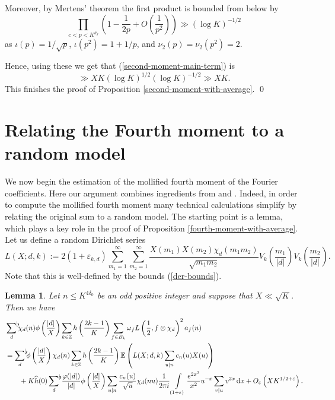 \documentclass[a4paper,10pt,twoside]{amsart}
\newtheorem{lemma}[theorem]{Lemma}
\theoremstyle{definition}
\numberwithin{equation}{section}
\newcommand\Z{\mathbb{Z}}
\newcommand\eps{\varepsilon}
\renewcommand\:{\colon}
\newcommand{\sumflat}{\mathop{{\sum}^{\raisebox{-3pt}{\makebox[0pt][l]{$\flat$}}}}}
\begin{document}
Moreover, by Mertens' theorem the first product is bounded from below by
\[ 
\prod_{c<p<K^{\theta_J}}\left(1-\frac1{2p}+O\left(\frac1{p^2}\right)\right)\gg (\log K)^{-1/2}
\]
as $\iota(p)=1/\sqrt p$, $\iota(p^2)=1+1/p$, and $\nu_2(p)=\nu_2(p^2)=2$.

Hence, using these we get that (\ref{second-moment-main-term}) is
\[ 
\gg XK(\log K)^{1/2}(\log K)^{-1/2}\gg XK.\]
This finishes the proof of Proposition \ref{second-moment-with-average}. \qed

\section{Relating the Fourth moment to a random model}

\noindent We now begin the estimation of the mollified fourth moment of the Fourier coefficients. Here our argument combines ingredients from \cite{Bui-Evans-Lester-Pratt2022} and \cite{Khan2010}. Indeed, in order to compute the mollified fourth moment many technical calculations simplify by relating the original sum to a random model. The starting point is a lemma, which plays a key role in the proof of Proposition \ref{fourth-moment-with-average}. Let us define a random Dirichlet series
\[ 
L(X;d,k):=2(1+\varepsilon_{k,d})\sum_{m_1=1}^\infty\sum_{m_2=1}^\infty\frac{X(m_1)X(m_2)\chi_{d}(m_1m_2)}{\sqrt{m_1m_2}}V_k\left(\frac {m_1}{|d|}\right)V_k\left(\frac {m_2}{|d|}\right).
\]
\noindent Note that this is well-defined by the bounds (\ref{der-bounds}). 

\begin{lemma}\label{twisted-second-moment-averaged}
Let $n\leq K^{4\delta_0}$ be an odd positive integer and suppose that $X\ll\sqrt K$. Then we have
\begin{align*}
&\sumflat_{d}\chi_d(n)\phi\left(\frac{|d|}X\right)\sum_{k\in\Z}h\left(\frac{2k-1}K\right)\sum_{f\in B_k}\omega_f L\left(\frac12,f\otimes\chi_d\right)^2a_f(n)\\
&=\sumflat_{d}\phi\left(\frac{|d|}X\right)\chi_d(n)\sum_{k\in\Z}h\left(\frac{2k-1}K\right)\mathbb E\left(L(X;d,k)\sum_{u|n}c_n(u)X(u)\right)\\
&\qquad+K\widehat h(0)\sumflat_{d}\,\frac{\varphi(|d|)}{|d|}\phi\left(\frac{|d|}X\right)\sum_{u|n}\frac{c_n(u)}{\sqrt u}\chi_d(nu)\frac1{2\pi i}\int\limits_{(1+\eps)}\frac{e^{2x^2}}{x^2}u^{-x}\sum_{v|u}v^{2x}\,\mathrm d x+O_\eps\left(XK^{1/2+\varepsilon}\right).
\end{align*}
\end{lemma}
\end{document}
